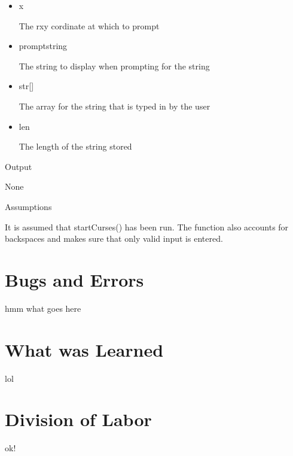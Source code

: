 \documentclass[pdftex, 11pt]{article}
\begin{document}
\begin{description}
\begin{description}
\begin{itemize}
						The y cordinate at which to prompt

					\item{x}

						The rxy cordinate at which to prompt

					\item{promptstring}

						The string to display when prompting
						for the string

					\item{str[]}

						The array for the string that is typed
						in by the user

					\item{len}

						The length of the string stored

				\end{itemize}

			\item{Output}

				None

			\item{Assumptions}

				It is assumed that startCurses() has been run.
				The function also accounts for backspaces and
				makes sure that only valid input is entered.

		\end{description}


\end{description}

\section{Bugs and Errors}

hmm what goes here

\section{What was Learned}

lol

\section{Division of Labor}

ok!
\end{document}
